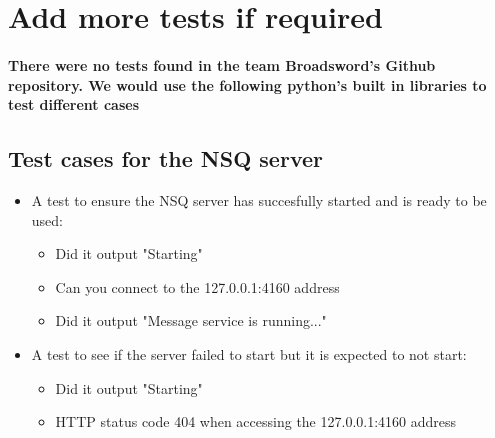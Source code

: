 \documentclass[11pt]{article}
\begin{document}
			\paragraph{}

	\section{Add more tests if required}
		\paragraph{There were no tests found in the team Broadsword's Github repository. We would use the following python's built in libraries to test different cases}
		\subsection{Test cases for the NSQ server}	
			\begin{itemize}
				\item A test to ensure the NSQ server has succesfully started and is ready to be used:
					\begin{itemize}
						\item Did it output "Starting"
						\item Can you connect to the 127.0.0.1:4160 address
						\item Did it output "Message service is running..."
					\end{itemize}
				\item A test to see if the server failed to start but it is expected to not start:
					\begin{itemize}
						\item Did it output "Starting"
						\item HTTP status code 404 when accessing the 127.0.0.1:4160 address
					\end{itemize}
			\end{itemize}
\end{document}
